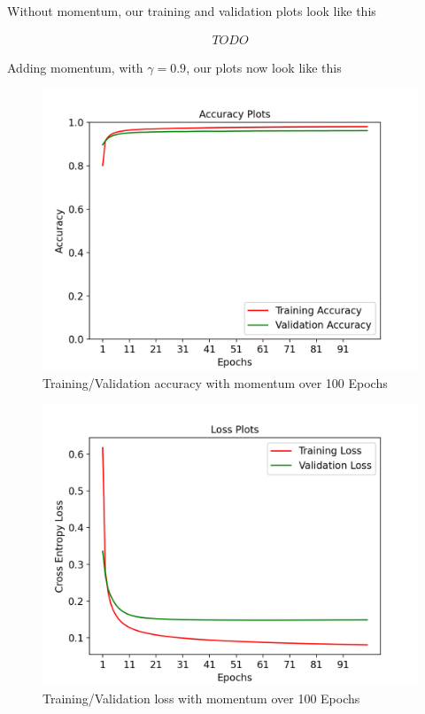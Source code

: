 Without momentum, our training and validation plots look like this


\begin{align*}
	TODO
\end{align*}

Adding momentum, with $\gamma = 0.9$, our plots now look like this

\begin{figure}[!ht]
	\centering
	\includegraphics[width=1.0\textwidth]{./images/accuracy_momentum.png}
	\caption{Training/Validation accuracy with momentum over 100 Epochs}
\end{figure}

\begin{figure}[!ht]
	\centering
	\includegraphics[width=1.0\textwidth]{./images/loss_momentum.png}
	\caption{Training/Validation loss with momentum over 100 Epochs}
\end{figure}

